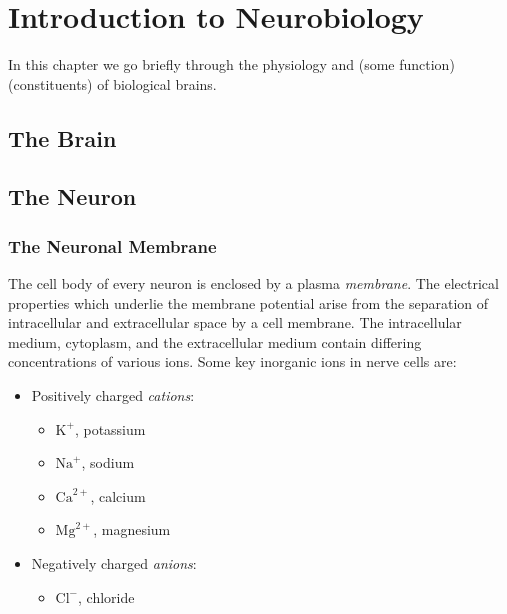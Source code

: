 \chapter{Introduction to Neurobiology}\label{chap:neuro}


In this chapter we go briefly through the physiology and (some function)(constituents) of biological brains.

\section{The Brain}



\section{The Neuron}



\subsection{The Neuronal Membrane}

The cell body of every neuron is enclosed by a plasma \textit{membrane}. The electrical properties which underlie the membrane potential arise from the separation of intracellular and extracellular space by a cell membrane. The intracellular medium, cytoplasm, and the extracellular medium contain differing concentrations of various ions. Some key inorganic ions in nerve cells are: 

\begin{itemize}
    \item Positively charged \textit{cations}:
    \begin{itemize}
        \item $\mathrm{K}^+$, potassium
        \item $\mathrm{Na}^+$, sodium 
        \item $\mathrm{Ca}^{2+}$, calcium
        \item $\mathrm{Mg}^{2+}$, magnesium
    \end{itemize}
    \item Negatively charged \textit{anions}:
    \begin{itemize}
        \item $\mathrm{Cl}^-$, chloride
    \end{itemize}
\end{itemize}


